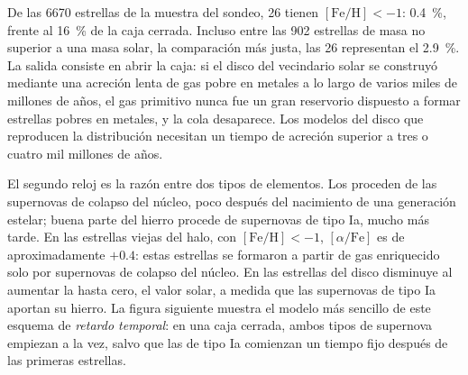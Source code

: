 De las 6670 estrellas de la muestra del sondeo, 26 tienen $[\mathrm{Fe/H}] < -1$:
\qty{0.4}{\percent}, frente al \qty{16}{\percent} de la caja cerrada.
Incluso entre las 902 estrellas de masa no superior a una masa solar, la comparación más
justa, las 26 representan el \qty{2.9}{\percent}. La salida consiste en abrir la
caja: si el disco del vecindario solar se construyó mediante una acreción lenta
de gas pobre en metales a lo largo de varios miles de millones de años, el gas primitivo nunca fue
un gran reservorio dispuesto a formar estrellas pobres en metales, y la cola
desaparece. Los modelos del disco que reproducen la distribución necesitan un tiempo
de acreción superior a tres o cuatro mil millones de años.

El segundo reloj es la razón entre dos tipos de elementos. Los 
proceden de las supernovas de colapso del núcleo, poco después del nacimiento de una
generación estelar; buena parte del hierro procede de supernovas de tipo Ia,
mucho más tarde. En las estrellas viejas del halo, con $[\mathrm{Fe/H}] < -1$,
$[\alpha/\mathrm{Fe}]$ es de aproximadamente $+0.4$: estas estrellas se formaron a partir de gas
enriquecido solo por supernovas de colapso del núcleo. En las estrellas del disco
disminuye al aumentar la  hasta cero, el valor solar, a medida que las
supernovas de tipo Ia aportan su hierro. La figura siguiente muestra el modelo más
sencillo de este esquema de \emph{retardo temporal}: en una caja cerrada, ambos tipos de
supernova empiezan a la vez, salvo que las de tipo Ia comienzan un tiempo fijo después de
las primeras estrellas.

